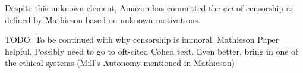 \documentclass[11pt]{article}
\begin{document}
\begin{multicols}{2}
Despite this unknown element, Amazon has committed the \emph{act} of censorship as defined by Mathieson based on unknown motivations.

TODO: To be continued with why censorship is immoral. Mathieson Paper helpful.  Possibly need to go to oft-cited Cohen text. Even better, bring in one of the ethical systems (Mill's Autonomy mentioned in Mathieson)



\end{multicols}
\end{document}
